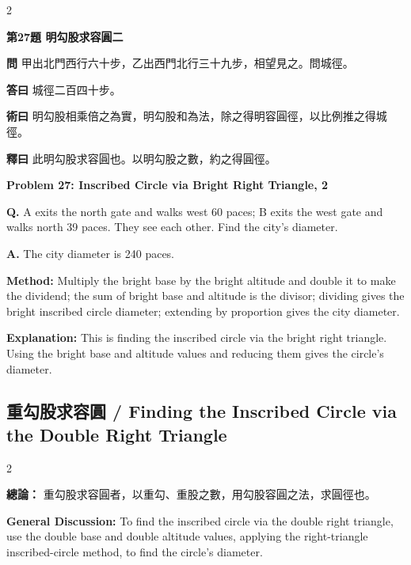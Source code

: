 \documentclass[11pt,a4paper]{article}
\newcommand{\wen}[1]{\noindent\textbf{問} #1\par\smallskip}
\newcommand{\da}[1]{\noindent\textbf{答曰} #1\par\smallskip}
\newcommand{\shu}[1]{\noindent\textbf{術曰} #1\par\smallskip}
\newcommand{\shi}[1]{\noindent\textbf{釋曰} #1\par\smallskip}
\newcommand{\wenE}[1]{\noindent\textbf{Q.} #1\par\smallskip}
\newcommand{\daE}[1]{\noindent\textbf{A.} #1\par\smallskip}
\newcommand{\shuE}[1]{\noindent\textbf{Method:} #1\par\smallskip}
\newcommand{\shiE}[1]{\noindent\textbf{Explanation:} #1\par\smallskip}
\begin{document}
\bigskip

\begin{paracol}{2}

\noindent\textbf{第27題 明勾股求容圓二}

\wen{甲出北門西行六十步，乙出西門北行三十九步，相望見之。問城徑。}
\da{城徑二百四十步。}
\shu{明勾股相乘倍之為實，明勾股和為法，除之得明容圓徑，以比例推之得城徑。}
\shi{此明勾股求容圓也。以明勾股之數，約之得圓徑。}

\switchcolumn

\noindent\textbf{Problem 27: Inscribed Circle via Bright Right Triangle, 2}

\wenE{A exits the north gate and walks west 60 paces; B exits the west gate and walks north 39 paces. They see each other. Find the city's diameter.}
\daE{The city diameter is 240 paces.}
\shuE{Multiply the bright base by the bright altitude and double it to make the dividend; the sum of bright base and altitude is the divisor; dividing gives the bright inscribed circle diameter; extending by proportion gives the city diameter.}
\shiE{This is finding the inscribed circle via the bright right triangle. Using the bright base and altitude values and reducing them gives the circle's diameter.}

\end{paracol}

\clearpage

\subsection*{重勾股求容圓 / Finding the Inscribed Circle via the Double Right Triangle}

\begin{paracol}{2}

\noindent\textbf{總論：} 重勾股求容圓者，以重勾、重股之數，用勾股容圓之法，求圓徑也。

\switchcolumn

\noindent\textbf{General Discussion:} To find the inscribed circle via the double right triangle, use the double base and double altitude values, applying the right-triangle inscribed-circle method, to find the circle's diameter.

\end{paracol}
\end{document}
